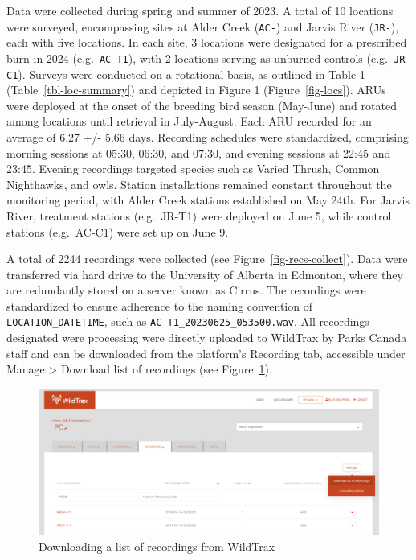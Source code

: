 \documentclass[
  letterpaper,
  DIV=11,
  numbers=noendperiod,
  oneside]{scrartcl}
\begin{document}
Data were collected during spring and summer of 2023. A total of 10
locations were surveyed, encompassing sites at Alder Creek
(\texttt{AC-}) and Jarvis River (\texttt{JR-}), each with five
locations. In each site, 3 locations were designated for a prescribed
burn in 2024 (e.g.~\texttt{AC-T1}), with 2 locations serving as unburned
controls (e.g.~\texttt{JR-C1}). Surveys were conducted on a rotational
basis, as outlined in Table 1 (Table~\ref{tbl-loc-summary}) and depicted
in Figure 1 (Figure~\ref{fig-locs}). ARUs were deployed at the onset of
the breeding bird season (May-June) and rotated among locations until
retrieval in July-August. Each ARU recorded for an average of 6.27 +/-
5.66 days. Recording schedules were standardized, comprising morning
sessions at 05:30, 06:30, and 07:30, and evening sessions at 22:45 and
23:45. Evening recordings targeted species such as Varied Thrush, Common
Nighthawks, and owls. Station installations remained constant throughout
the monitoring period, with Alder Creek stations established on May
24th. For Jarvis River, treatment stations (e.g.~JR-T1) were deployed on
June 5, while control stations (e.g.~AC-C1) were set up on June 9.

A total of 2244 recordings were collected (see
Figure~\ref{fig-recs-collect}). Data were transferred via hard drive to
the University of Alberta in Edmonton, where they are redundantly stored
on a server known as Cirrus. The recordings were standardized to ensure
adherence to the naming convention of \texttt{LOCATION\_DATETIME}, such
as \texttt{AC-T1\_20230625\_053500.wav}. All recordings designated were
processing were directly uploaded to WildTrax by Parks Canada staff and
can be downloaded from the platform's Recording tab, accessible under
Manage \textgreater{} Download list of recordings (see
Figure~\ref{fig-download-recs}).

\begin{figure}

{\centering \includegraphics{download-recs.png}

}

\caption{\label{fig-download-recs}Downloading a list of recordings from
WildTrax}

\end{figure}
\end{document}
